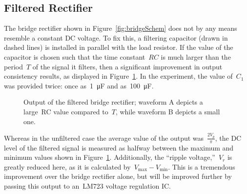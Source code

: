 \subsection{Filtered Rectifier}
The bridge rectifier shown in Figure~\ref{fig:bridgeSchem} does not by any
means resemble a constant DC voltage.  To fix this, a filtering capacitor
(drawn in dashed lines) is installed in parallel with the load resistor.  If
the value of the capacitor is chosen such that the time constant~$RC$ is much
larger than the period~$T$ of the signal it filters, then a significant
improvement in output consistency results, as displayed in
Figure~\ref{fig:bridgeRectOutFilt}.  In the experiment, the value of~$C_1$ was
provided twice: once as~\SI{1}{\micro\farad} and as~\SI{100}{\micro\farad}.
%
\begin{figure}[H]
	\centering
	
	\parbox{.6\textwidth}{
	\caption{Output of the filtered bridge rectifier; waveform A depicts a
	large~RC value compared to~$T$, while waveform B depicts a small one.}
	\label{fig:bridgeRectOutFilt}
	}
\end{figure}
%
Whereas in the unfiltered case the average value of the output was~$\frac{2
V_p}{\pi}$, the DC level of the filtered signal is measured as halfway between
the maximum and minimum values shown in Figure~\ref{fig:bridgeRectOutFilt}.
Additionally, the ``ripple voltage,''~$V_r$ is greatly reduced here, as it is
calculated by~$V_\text{max} - V_\text{min}$.  This is a tremendous improvement
over the bridge rectifier alone, but will be improved further by passing this
output to an~LM723 voltage regulation IC.

